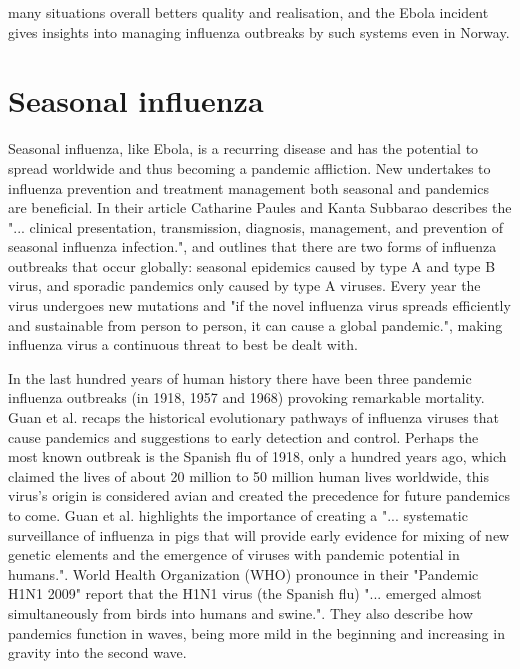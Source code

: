 many situations overall betters quality and realisation, and the Ebola incident gives insights into managing influenza outbreaks by such systems even in Norway.




\section{Seasonal influenza}
Seasonal influenza, like Ebola, is a recurring disease and has the potential to spread worldwide and thus becoming a pandemic affliction. New undertakes to influenza prevention and treatment management both seasonal and pandemics are beneficial. In their article Catharine Paules and Kanta Subbarao\cite{article_Paules} describes the "... clinical presentation, transmission, diagnosis, management, and prevention of seasonal influenza infection.", and outlines that there are two forms of influenza outbreaks that occur globally: seasonal epidemics caused by type A and type B virus, and sporadic pandemics only caused by type A viruses. Every year the virus undergoes new mutations and "if the novel influenza virus spreads efficiently and sustainable from person to person, it can cause a global pandemic.", making influenza virus a continuous threat to best be dealt with.

In the last hundred years of human history there have been three pandemic influenza outbreaks (in 1918, 1957 and 1968) provoking remarkable mortality. Guan et al.\cite{guan2010emergence} recaps the historical evolutionary pathways of influenza viruses that cause pandemics and suggestions to early detection and control. Perhaps the most known outbreak is the Spanish flu of 1918, only a hundred years ago, which claimed the lives of about 20 million to 50 million human lives worldwide, this virus's origin is considered avian and created the precedence for future pandemics to come. Guan et al. highlights the importance of creating a "... systematic surveillance of influenza in pigs that will provide early evidence for mixing of new genetic elements and the emergence of viruses with pandemic potential in humans.". World Health Organization (WHO) pronounce in their "Pandemic H1N1 2009"\cite{world2009pandemic} report that the H1N1 virus (the Spanish flu) "... emerged almost simultaneously from birds into humans and swine.". They also describe how pandemics function in waves, being more mild in the beginning and increasing in gravity into the second wave.


